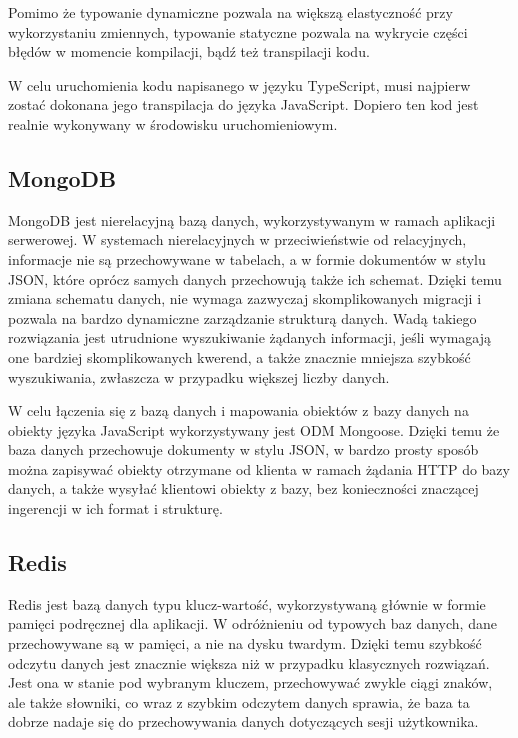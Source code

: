 \documentclass[a4paper,12pt,twoside,openany]{report}
\begin{document}
Pomimo że typowanie dynamiczne pozwala na większą elastyczność przy wykorzystaniu zmiennych, typowanie statyczne pozwala na wykrycie części błędów w momencie kompilacji, bądź też transpilacji kodu.

W celu uruchomienia kodu napisanego w języku TypeScript, musi najpierw zostać dokonana jego transpilacja do języka JavaScript. Dopiero ten kod jest realnie wykonywany w środowisku uruchomieniowym.

\subsection{MongoDB}
MongoDB jest nierelacyjną bazą danych, wykorzystywanym w ramach aplikacji serwerowej. W systemach nierelacyjnych w przeciwieństwie od relacyjnych, informacje nie są przechowywane w tabelach, a w formie dokumentów w stylu JSON, które oprócz samych danych przechowują także ich schemat. Dzięki temu zmiana schematu danych, nie wymaga zazwyczaj skomplikowanych migracji i pozwala na bardzo dynamiczne zarządzanie strukturą danych. Wadą takiego rozwiązania jest utrudnione wyszukiwanie żądanych informacji, jeśli wymagają one bardziej skomplikowanych kwerend, a także znacznie mniejsza szybkość wyszukiwania, zwłaszcza w przypadku większej liczby danych. 

W celu łączenia się z bazą danych i mapowania obiektów z bazy danych na obiekty języka JavaScript wykorzystywany jest ODM Mongoose. Dzięki temu że baza danych przechowuje dokumenty w stylu JSON, w bardzo prosty sposób można zapisywać obiekty otrzymane od klienta w ramach żądania HTTP do bazy danych, a także wysyłać klientowi obiekty z bazy, bez konieczności znaczącej ingerencji w ich format i strukturę.

\subsection{Redis}
Redis jest bazą danych typu klucz-wartość, wykorzystywaną głównie w formie pamięci podręcznej dla aplikacji. W odróżnieniu od typowych baz danych, dane przechowywane są w pamięci, a nie na dysku twardym. Dzięki temu szybkość odczytu danych jest znacznie większa niż w przypadku klasycznych rozwiązań.
Jest ona w stanie pod wybranym kluczem, przechowywać zwykle ciągi znaków, ale także słowniki, co wraz z szybkim odczytem danych sprawia, że baza ta dobrze nadaje się do przechowywania danych dotyczących sesji użytkownika.
\end{document}
